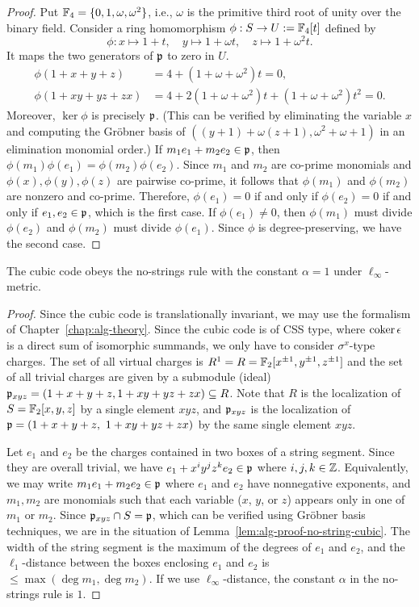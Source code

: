 \begin{proof}
Put $\mathbb{F}_4 = \{ 0, 1, \omega, \omega^2 \}$,
i.e., $\omega$ is the primitive third root of unity over the binary field.
Consider a ring homomorphism $\phi : S \to U:=\mathbb{F}_4[t]$ defined by
\[
\phi : x \mapsto 1+t, \quad y \mapsto 1+\omega t, \quad z \mapsto 1+\omega^2 t .
\]
It maps the two generators of $\mathfrak{p}$ to zero in $U$.
\begin{align*}
 \phi(1+x+y+z)    &= 4 + (1+\omega+\omega^2) t = 0 ,\\
 \phi(1+xy+yz+zx) &= 4 + 2(1+\omega+\omega^2)t + (1+\omega+\omega^2)t^2 = 0 .
\end{align*}
Moreover, $\ker \phi$ is precisely $\mathfrak{p}$.
(This can be verified by eliminating the variable $x$ 
and computing the Gr\"obner basis of $((y+1)+\omega(z+1),\omega^2+\omega+1)$ in an elimination monomial order.)
If $m_1 e_1 + m_2 e_2 \in \mathfrak{p}$, then $\phi(m_1)\phi(e_1) = \phi(m_2)\phi(e_2)$.
Since $m_1$ and $m_2$ are co-prime monomials and $\phi(x),\phi(y),\phi(z)$ are pairwise co-prime,
it follows that $\phi(m_1)$ and $\phi(m_2)$ are nonzero and co-prime.
Therefore, $\phi(e_1) = 0$ if and only if $\phi(e_2) = 0$ if and only if $e_1, e_2 \in \mathfrak{p}$,
which is the first case.
If $\phi(e_1) \neq 0$, then $\phi(m_1)$ must divide $\phi(e_2)$ and $\phi(m_2)$ must divide $\phi(e_1)$.
Since $\phi$ is degree-preserving, we have the second case.
\end{proof}
\begin{theorem}
The cubic code obeys the no-strings rule with the constant $\alpha = 1$ under $\ell_\infty$-metric.
\label{thm:CubicCode-no-strings}
\end{theorem}
\begin{proof}
Since the cubic code is translationally invariant,
we may use the formalism of Chapter~\ref{chap:alg-theory}.
Since the cubic code is of CSS type, where $\mathop{\mathrm{coker}}\nolimits \epsilon$ is a direct sum of isomorphic summands,
we only have to consider $\sigma^x$-type charges.
The set of all virtual charges is $R^1 = R = \mathbb{F}_2[x^{\pm 1},y^{\pm 1},z^{\pm 1}]$
and the set of all trivial charges are given by a submodule (ideal) $\mathfrak{p}_{xyz} = (1+x+y+z,1+xy+yz+zx) \subseteq R$.
Note that $R$ is the localization of $S = \mathbb{F}_2[x,y,z]$ by a single element $xyz$,
and $\mathfrak{p}_{xyz}$ is the localization of $\mathfrak{p} = (1+x+y+z,~1+xy+yz+zx)$ by the same single element $xyz$.

Let $e_1$ and $e_2$ be the charges contained in two boxes of a string segment.
Since they are overall trivial, we have $e_1 + x^i y^j z^k e_2 \in \mathfrak{p}$ where $i,j,k \in \mathbb{Z}$.
Equivalently, we may write $m_1 e_1 + m_2 e_2 \in \mathfrak{p}$ where $e_1$ and $e_2$ have nonnegative exponents,
and $m_1, m_2$ are monomials such that each variable ($x$, $y$, or $z$) appears
only in one of $m_1$ or $m_2$.
Since $\mathfrak{p}_{xyz} \cap S = \mathfrak{p}$, which can be verified using Gr\"obner basis techniques,
we are in the situation of Lemma~\ref{lem:alg-proof-no-string-cubic}.
The width of the string segment is the maximum of the degrees of $e_1$ and $e_2$,
and the $\ell_1$-distance between the boxes enclosing $e_1$ and $e_2$ is $\le \max( \deg m_1, \deg m_2 )$.
If we use $\ell_\infty$-distance, the constant $\alpha$ in the no-strings rule is $1$.
\end{proof}


